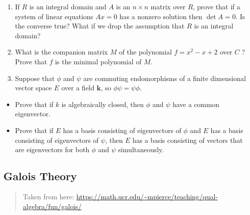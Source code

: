 \begin{enumerate}
\def\labelenumi{\arabic{enumi}.}
\setcounter{enumi}{3}
\tightlist
\item
  If \(R\) is an integral domain and \(A\) is an \(n \times n\) matrix
  over \(R\), prove that if a system of linear equations \(A x=0\) has a
  nonzero solution then \(\operatorname{det} A=0\). Is the converse
  true? What if we drop the assumption that \(R\) is an integral domain?
\item
  What is the companion matrix \(M\) of the polynomial \(f=x^{2}-x+2\)
  over \(C\) ? Prove that \(f\) is the minimal polynomial of \(M\).
\item
  Suppose that \(\phi\) and \(\psi\) are commuting endomorphisms of a
  finite dimensional vector space \(E\) over a field \(\boldsymbol{k}\),
  so \(\phi \psi=\psi \phi\).
\end{enumerate}

\begin{itemize}
\tightlist
\item
  Prove that if \(k\) is algebraically closed, then \(\phi\) and
  \(\psi\) have a common eigenvector.
\item
  Prove that if \(E\) has a basis consisting of eigenvectors of \(\phi\)
  and \(E\) has a basis consisting of eigenvectors of \(\psi\), then
  \(E\) has a basis consisting of vectors that are eigenvectors for both
  \(\phi\) and \(\psi\) simultaneously.
\end{itemize}

\hypertarget{galois-theory-1}{%
\subsection{Galois Theory}\label{galois-theory-1}}

\begin{quote}
Taken from here:
\url{https://math.ucr.edu/~mpierce/teaching/qual-algebra/fun/galois/}
\end{quote}

